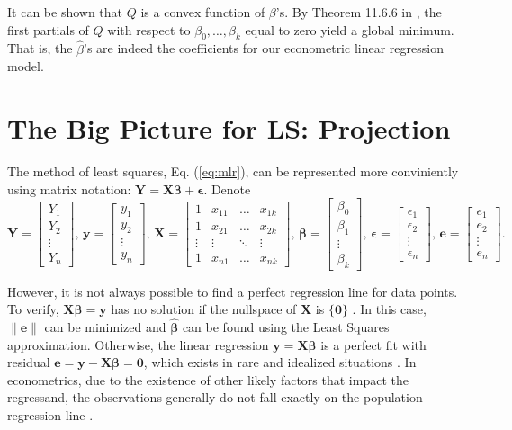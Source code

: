 \documentclass[final]{siamart1116}
\begin{document}
It can be shown that $Q$ is a convex function of $\beta$'s. By Theorem 11.6.6 in \cite{bk:petrovic}, the first partials of $Q$ with respect to $\beta_{0},\dots, \beta_{k}$ equal to zero yield a global minimum. That is, the $\widehat{\beta}$'s are indeed the coefficients for our econometric linear regression model. 


\section{The Big Picture for LS: Projection}
\label{sec:la}
The method of least squares, Eq. (\ref{eq:mlr}), can be represented more conviniently using matrix notation: $\pmb{Y}=\pmb{X\beta}+\pmb{\epsilon}$. Denote
\[
\pmb{Y}=\begin{bmatrix}
Y_{1}\\Y_{2}\\\vdots\\Y_{n}
\end{bmatrix},\,
\pmb{y}=\begin{bmatrix}
y_{1}\\y_{2}\\\vdots\\y_{n}
\end{bmatrix},\,
\pmb{X}=\begin{bmatrix}
1      & x_{11} & \dots  & x_{1k}\\
1      & x_{21} & \dots  & x_{2k}\\
\vdots & \vdots & \ddots & \vdots\\
1      & x_{n1} & \dots  & x_{nk}
\end{bmatrix},\,
\pmb{\beta}=\begin{bmatrix}
\beta_{0}\\\beta_{1}\\\vdots\\\beta_{k}
\end{bmatrix},\,
\pmb{\epsilon}=\begin{bmatrix}
\epsilon_{1}\\\epsilon_{2}\\\vdots\\\epsilon_{n}
\end{bmatrix},\,
\pmb{e}=\begin{bmatrix}
e_{1}\\e_{2}\\\vdots\\e_{n}
\end{bmatrix}.
\]

However, it is not always possible to find a perfect regression line for data points. To verify, $\pmb{X}\pmb{\beta}=\pmb{y}$ has no solution if the nullspace of $\pmb{X}$ is $\{\pmb{0}\}$ \cite{bk:strang}. In this case, $\|\pmb{e}\|$ can be minimized and $\pmb{\widehat{\beta}}$ can be found using the Least Squares approximation. Otherwise, the linear regression $\pmb{y}=\pmb{X}\pmb{\beta}$ is a perfect fit with residual $\pmb{e}=\pmb{y}-\pmb{X}\pmb{\beta}=\pmb{0}$, which exists in rare and idealized situations \cite{bk:tamhane_dunlop}. In econometrics, due to the existence of other likely factors that impact the regressand, the observations generally do not fall exactly on the population regression line \cite{bk:stock_watson}.
\end{document}
